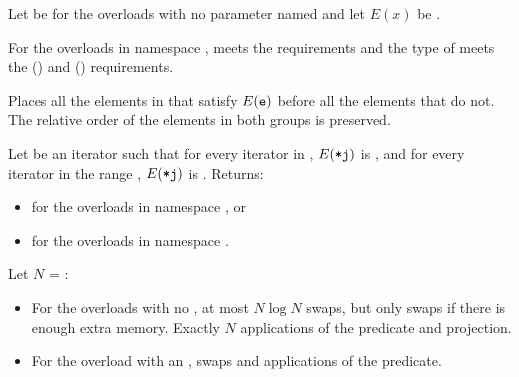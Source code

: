 \begin{itemdescr}
\pnum
Let  be 
for the overloads with no parameter named 
and let $E(x)$ be .

\pnum
\expects
For the overloads in namespace ,
 meets
the  requirements and
the type of  meets
the  () and
 () requirements.

\pnum
\effects
Places all the elements  in 
that satisfy $E(\texttt{e})$ before all the elements that do not.
The relative order of the elements in both groups is preserved.

\pnum
\returns
Let  be an iterator
such that for every iterator  in ,
$E(\texttt{*j})$ is ,
and for every iterator  in the range ,
$E(\texttt{*j})$ is .
Returns:
\begin{itemize}
\item {} for the overloads in namespace , or
\item {} for the overloads in namespace .
\end{itemize}


\pnum
\complexity
Let $N$ = :
\begin{itemize}
\item
  For the overloads with no , at most $N \log N$ swaps,
  but only  swaps if there is enough extra memory.
  Exactly $N$ applications of the predicate and projection.
\item
  For the overload with an ,
   swaps and  applications of the predicate.
\end{itemize}
\end{itemdescr}

